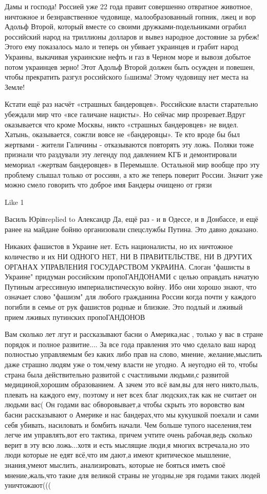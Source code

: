 Дамы и господа! Россией уже 22 года правит совершенно отвратное животное, ничтожное и безнравственное чудовище, малообразованный гопник, лжец и вор Адольф Второй, который вместе со своими дружками-подельниками ограбил российский народ на триллионы долларов и вывез народное достояние за рубеж! Этого ему показалось мало и теперь он убивает украинцев и грабит народ Украины, выкачивая украинские нефть и газ в Черном море и вывозя добытое потом украинцев зерно! Этот Адольф Второй должен быть осужден и повешен, чтобы прекратить разгул российского faшизма! Этому чудовищу нет места на Земле!

Кстати ещё раз насчёт «страшных бандеровцев». Российские власти старательно убеждали мир что «все галичане нацисты». Но сейчас мир прозревает.Вдруг оказывается что кроме Москвы, никто «страшных бандеровцев» не видел. Хатынь, оказывается, сожгли вовсе не «бандеровцы». Те кто вроде бы был жертвами - жители Галичины - отказываются повторять эту ложь. Поляки тоже признали что раздували эту легенду под давлением КГБ и демонтировали мемориал «жертвам бандеровцев» в Перемышле. Остальной мир вообще про эту проблему слышал только от россиян, а кто же теперь поверит России. Значит уже можно смело говорить что доброе имя Бандеры очищено от грязи

    Like 1

Василь Юрівreplied to Александр
Да, ещё раз - и в Одессе, и в Донбассе, и ещё ранее на майдане бойню организовали спецслужбы Путина. Это давно доказано.


Никаких фашистов в Украине нет. Есть националисты, но их ничтожное количество и
их НИ ОДНОГО НЕТ, НИ В ПРАВИТЕЛЬСТВЕ, НИ В ДРУГИХ ОРГАНАХ УПРАВЛЕНИЯ
ГОСУДАРСТВОМ УКРАИНА. Слоган "фашисты в Украине" придуман российским
пропоГАНДОНАМИ с целью оправдать начатую Путиным агрессивную империалистическую
войну. Ибо они хорошо знают, что означает слово "фашизм" для любого гражданина
России когда почти у каждого погибли в семье от рук фашистов родные и близкие.
Это подлый и лживый прием лживых путинских пропоГАНДОНОВ

Вам сколько лет лгут и рассказывают басни о Америка,нас , только у вас в стране порядок и полное развитие....
За все года правления это чмо сделало ваш народ полностью управляемым без каких либо прав на слово, мнение, желание,мыслить даже страшно людям уже о том,чему власти не угодно.
А неугодно ей то, чтобы страна была действительно развитой с счастливыми людьми,с развитой медициной,хорошим образованием.
А зачем это всё вам,вы для него никто,пыль, плевать на каждого ему, поэтому и нет всех благ людских,так как не считает он людьми вас(
Он годами вас обворовывает,а чтобы скрыть это воровство вам басни рассказывают о Америке и нас бандерах,что мы кукушкой поехали и сами себя убивать, насиловать и бомбить начали.
Чем больше тупого населения,тем легче им управлять,вот его тактика, причем учтите очень рабочая,ведь сколько верит в эту всю ложь...хотя и есть мыслящие люди,я многих встречала,но это люди которые не едят всё,что им дают,а имеют критическое мышление, знания,умеют мыслить, анализировать, которые не бояться иметь своё мнение,жаль,что такие для великой страны не угодны,не зря годами таких людей уничтожают(((

